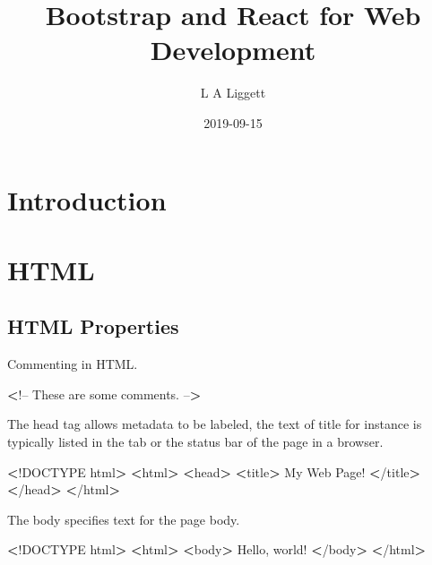 \documentclass[]{book}
\title{Bootstrap and React for Web Development}
\author{L A Liggett}
\date{2019-09-15}
\newenvironment{Shaded}{\begin{snugshade}}{\end{snugshade}}
\newcommand{\FunctionTok}[1]{\textcolor[rgb]{0.00,0.00,0.00}{#1}}
\newcommand{\OperatorTok}[1]{\textcolor[rgb]{0.81,0.36,0.00}{\textbf{#1}}}
\newcommand{\ExtensionTok}[1]{#1}
\newcommand{\NormalTok}[1]{#1}
\begin{document}
\maketitle

{
\setcounter{tocdepth}{1}
\tableofcontents
}
\chapter{Introduction}\label{introduction}

\chapter{HTML}\label{html}

\section{HTML Properties}\label{html-properties}

Commenting in HTML.

\begin{Shaded}
\begin{Highlighting}[]
\OperatorTok{<}\NormalTok{!}\ExtensionTok{--}
\ExtensionTok{These}\NormalTok{ are some comments.}
\ExtensionTok{--}\OperatorTok{>}
\end{Highlighting}
\end{Shaded}

The head tag allows metadata to be labeled, the text of title for
instance is typically listed in the tab or the status bar of the page in
a browser.

\begin{Shaded}
\begin{Highlighting}[]
\OperatorTok{<}\NormalTok{!}\ExtensionTok{DOCTYPE}\NormalTok{ html}\OperatorTok{>}         
\OperatorTok{<}\ExtensionTok{html}\OperatorTok{>}                  
    \OperatorTok{<}\FunctionTok{head}\OperatorTok{>}              
        \OperatorTok{<}\ExtensionTok{title}\OperatorTok{>}         
            \ExtensionTok{My}\NormalTok{ Web Page!}
        \OperatorTok{<}\NormalTok{/}\ExtensionTok{title}\OperatorTok{>}        
    \OperatorTok{<}\NormalTok{/}\ExtensionTok{head}\OperatorTok{>}             
\OperatorTok{<}\NormalTok{/}\ExtensionTok{html}\OperatorTok{>}                 
\end{Highlighting}
\end{Shaded}

The body specifies text for the page body.

\begin{Shaded}
\begin{Highlighting}[]
\OperatorTok{<}\NormalTok{!}\ExtensionTok{DOCTYPE}\NormalTok{ html}\OperatorTok{>}         
\OperatorTok{<}\ExtensionTok{html}\OperatorTok{>}                  
    \OperatorTok{<}\ExtensionTok{body}\OperatorTok{>}              
        \ExtensionTok{Hello}\NormalTok{, world!   }
    \OperatorTok{<}\NormalTok{/}\ExtensionTok{body}\OperatorTok{>}             
\OperatorTok{<}\NormalTok{/}\ExtensionTok{html}\OperatorTok{>}                 
\end{Highlighting}
\end{Shaded}
\end{document}
